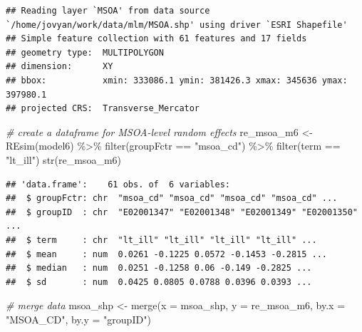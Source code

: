 \documentclass[
]{book}
\newenvironment{Shaded}{\begin{snugshade}}{\end{snugshade}}
\newcommand{\AttributeTok}[1]{\textcolor[rgb]{0.77,0.63,0.00}{#1}}
\newcommand{\CommentTok}[1]{\textcolor[rgb]{0.56,0.35,0.01}{\textit{#1}}}
\newcommand{\FunctionTok}[1]{\textcolor[rgb]{0.00,0.00,0.00}{#1}}
\newcommand{\NormalTok}[1]{#1}
\newcommand{\OtherTok}[1]{\textcolor[rgb]{0.56,0.35,0.01}{#1}}
\newcommand{\SpecialCharTok}[1]{\textcolor[rgb]{0.00,0.00,0.00}{#1}}
\newcommand{\StringTok}[1]{\textcolor[rgb]{0.31,0.60,0.02}{#1}}
\begin{document}
\begin{verbatim}
## Reading layer `MSOA' from data source `/home/jovyan/work/data/mlm/MSOA.shp' using driver `ESRI Shapefile'
## Simple feature collection with 61 features and 17 fields
## geometry type:  MULTIPOLYGON
## dimension:      XY
## bbox:           xmin: 333086.1 ymin: 381426.3 xmax: 345636 ymax: 397980.1
## projected CRS:  Transverse_Mercator
\end{verbatim}

\begin{Shaded}
\begin{Highlighting}[]
\CommentTok{\# create a dataframe for MSOA{-}level random effects}
\NormalTok{re\_msoa\_m6 }\OtherTok{\textless{}{-}} \FunctionTok{REsim}\NormalTok{(model6) }\SpecialCharTok{\%\textgreater{}\%} \FunctionTok{filter}\NormalTok{(groupFctr }\SpecialCharTok{==} \StringTok{"msoa\_cd"}\NormalTok{) }\SpecialCharTok{\%\textgreater{}\%}
  \FunctionTok{filter}\NormalTok{(term }\SpecialCharTok{==} \StringTok{"lt\_ill"}\NormalTok{)}
\FunctionTok{str}\NormalTok{(re\_msoa\_m6)}
\end{Highlighting}
\end{Shaded}

\begin{verbatim}
## 'data.frame':    61 obs. of  6 variables:
##  $ groupFctr: chr  "msoa_cd" "msoa_cd" "msoa_cd" "msoa_cd" ...
##  $ groupID  : chr  "E02001347" "E02001348" "E02001349" "E02001350" ...
##  $ term     : chr  "lt_ill" "lt_ill" "lt_ill" "lt_ill" ...
##  $ mean     : num  0.0261 -0.1225 0.0572 -0.1453 -0.2815 ...
##  $ median   : num  0.0251 -0.1258 0.06 -0.149 -0.2825 ...
##  $ sd       : num  0.0425 0.0805 0.0788 0.0396 0.0393 ...
\end{verbatim}

\begin{Shaded}
\begin{Highlighting}[]
\CommentTok{\# merge data}
\NormalTok{msoa\_shp }\OtherTok{\textless{}{-}} \FunctionTok{merge}\NormalTok{(}\AttributeTok{x =}\NormalTok{ msoa\_shp, }\AttributeTok{y =}\NormalTok{ re\_msoa\_m6, }\AttributeTok{by.x =} \StringTok{"MSOA\_CD"}\NormalTok{, }\AttributeTok{by.y =} \StringTok{"groupID"}\NormalTok{)}
\end{Highlighting}
\end{Shaded}
\end{document}
